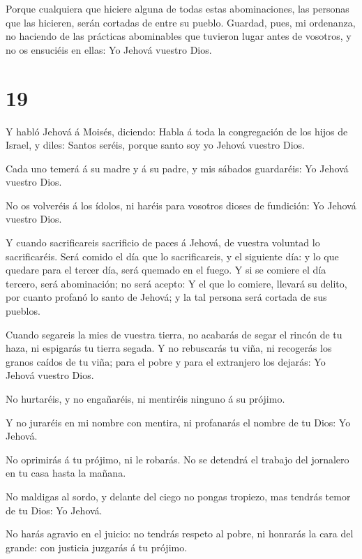  Porque cualquiera que hiciere alguna de todas estas
abominaciones, las personas que las hicieren, serán cortadas de entre su
pueblo.  Guardad, pues, mi ordenanza, no haciendo de las
prácticas abominables que tuvieron lugar antes de vosotros, y no os
ensuciéis en ellas: Yo Jehová vuestro Dios.

\hypertarget{section-18}{%
\section{19}\label{section-18}}

 Y habló Jehová á Moisés, diciendo:  Habla á
toda la congregación de los hijos de Israel, y diles: Santos seréis,
porque santo soy yo Jehová vuestro Dios.

 Cada uno temerá á su madre y á su padre, y mis sábados
guardaréis: Yo Jehová vuestro Dios.

 No os volveréis á los ídolos, ni haréis para vosotros
dioses de fundición: Yo Jehová vuestro Dios.

 Y cuando sacrificareis sacrificio de paces á Jehová, de
vuestra voluntad lo sacrificaréis.  Será comido el día que
lo sacrificareis, y el siguiente día: y lo que quedare para el tercer
día, será quemado en el fuego.  Y si se comiere el día
tercero, será abominación; no será acepto:  Y el que lo
comiere, llevará su delito, por cuanto profanó lo santo de Jehová; y la
tal persona será cortada de sus pueblos.

 Cuando segareis la mies de vuestra tierra, no acabarás de
segar el rincón de tu haza, ni espigarás tu tierra segada. 
Y no rebuscarás tu viña, ni recogerás los granos caídos de tu viña; para
el pobre y para el extranjero los dejarás: Yo Jehová vuestro Dios.

 No hurtaréis, y no engañaréis, ni mentiréis ninguno á su
prójimo.

 Y no juraréis en mi nombre con mentira, ni profanarás el
nombre de tu Dios: Yo Jehová.

 No oprimirás á tu prójimo, ni le robarás. No se detendrá
el trabajo del jornalero en tu casa hasta la mañana.

 No maldigas al sordo, y delante del ciego no pongas
tropiezo, mas tendrás temor de tu Dios: Yo Jehová.

 No harás agravio en el juicio: no tendrás respeto al
pobre, ni honrarás la cara del grande: con justicia juzgarás á tu
prójimo.

